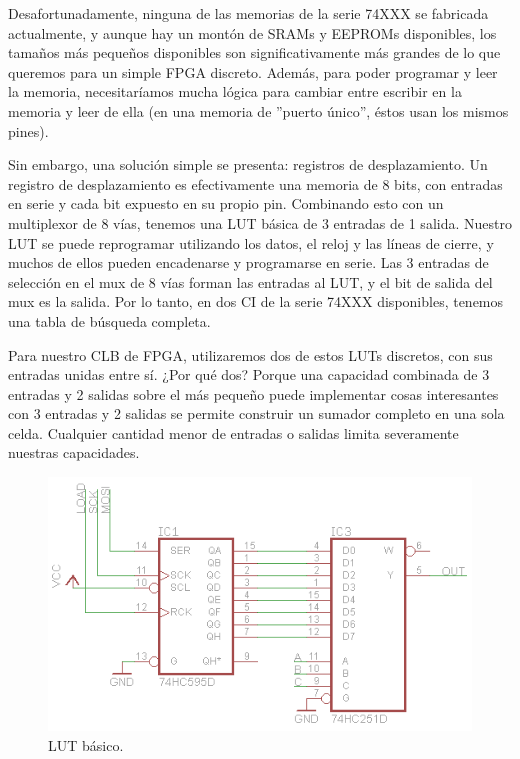 \documentclass[12pt]{article}
\begin{document}
Desafortunadamente, ninguna de las memorias de la serie 74XXX se fabricada actualmente, y aunque hay un montón de SRAMs y EEPROMs disponibles, los tamaños más pequeños disponibles son significativamente más grandes de lo que queremos para un simple FPGA discreto. Además, para poder programar y leer la memoria, necesitaríamos mucha lógica para cambiar entre escribir en la memoria y leer de ella (en una memoria de ''puerto único'', éstos usan los mismos pines). 
 
Sin embargo, una solución simple se presenta: registros de desplazamiento. Un registro de desplazamiento es efectivamente una memoria de 8 bits, con entradas en serie y cada bit expuesto en su propio pin. Combinando esto con un multiplexor de 8 vías, tenemos una LUT básica de 3 entradas de 1 salida. Nuestro LUT se puede reprogramar utilizando los datos, el reloj y las líneas de cierre, y muchos de ellos pueden encadenarse y programarse en serie. Las 3 entradas de selección en el mux de 8 vías forman las entradas al LUT, y el bit de salida del mux es la salida. Por lo tanto, en dos CI de la serie 74XXX disponibles, tenemos una tabla de búsqueda completa.  
 
Para nuestro CLB de FPGA, utilizaremos dos de estos LUTs discretos, con sus entradas unidas entre sí. ¿Por qué dos? Porque una capacidad combinada de 3 entradas y 2 salidas sobre el más pequeño puede implementar cosas interesantes con 3 entradas y 2 salidas se permite construir un sumador completo en una sola celda. Cualquier cantidad menor de entradas o salidas limita severamente nuestras capacidades.

\begin{figure}[H]
  \centering
  \includegraphics[]{8-lut.png}
  \caption{LUT básico.}
  \label{fig:5}
\end{figure}
\end{document}

